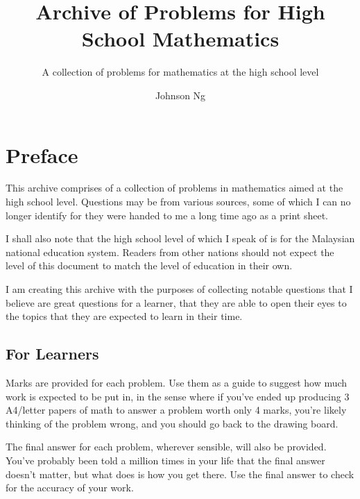 \documentclass[notoc,notitlepage]{tufte-book}
\title{Archive of Problems for High School Mathematics}
\author{Johnson Ng}
\subtitle{A collection of problems for mathematics at the high school level}
\begin{document}
\makeatletter
\fancyhead[LE]{\thepage \enspace \textsl{\leftmark}}
\makeatother

\hypersetup{pageanchor=false}
\maketitle
\hypersetup{pageanchor=true}
\begin{fullwidth}
\tableofcontents
\end{fullwidth}

\chapter*{Preface}%
\label{chp:preface}

This archive comprises of a collection of problems in mathematics aimed at the
high school level. Questions may be from various sources, some of which I can
no longer identify for they were handed to me a long time ago as a print sheet.

I shall also note that the high school level of which I speak of is for the
Malaysian national education system. Readers from other nations should not
expect the level of this document to match the level of education in their own.

I am creating this archive with the purposes of collecting notable questions
that I believe are great questions for a learner, that they are able to open
their eyes to the topics that they are expected to learn in their time.

\section*{For Learners}

Marks are provided for each problem. Use them as a guide to suggest how much
work is expected to be put in, in the sense where if you've ended up producing
3 A4/letter papers of math to answer a problem worth only 4 marks, you're likely
thinking of the problem wrong, and you should go back to the drawing board.

The final answer for each problem, wherever sensible, will also be provided.
You've probably been told a million times in your life that the final answer doesn't matter, but
what does is how you get there. Use the final answer to check for the accuracy
of your work.
\end{document}
